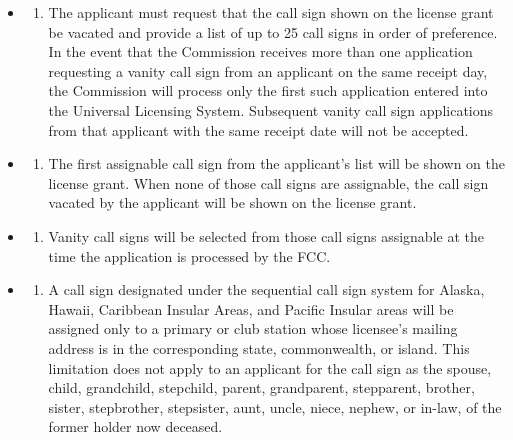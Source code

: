 \documentclass[
  letterpaper,
  DIV=11,
  numbers=noendperiod]{scrreport}
\providecommand{\tightlist}{%
  \setlength{\itemsep}{0pt}\setlength{\parskip}{0pt}}\usepackage{longtable,booktabs,array}
\begin{document}
\begin{itemize}
\item
  \begin{enumerate}
  \def\labelenumi{(\arabic{enumi})}
  \tightlist
  \item
    The applicant must request that the call sign shown on the license
    grant be vacated and provide a list of up to 25 call signs in order
    of preference. In the event that the Commission receives more than
    one application requesting a vanity call sign from an applicant on
    the same receipt day, the Commission will process only the first
    such application entered into the Universal Licensing System.
    Subsequent vanity call sign applications from that applicant with
    the same receipt date will not be accepted.
  \end{enumerate}
\item
  \begin{enumerate}
  \def\labelenumi{(\arabic{enumi})}
  \setcounter{enumi}{1}
  \tightlist
  \item
    The first assignable call sign from the applicant's list will be
    shown on the license grant. When none of those call signs are
    assignable, the call sign vacated by the applicant will be shown on
    the license grant.
  \end{enumerate}
\item
  \begin{enumerate}
  \def\labelenumi{(\arabic{enumi})}
  \setcounter{enumi}{2}
  \tightlist
  \item
    Vanity call signs will be selected from those call signs assignable
    at the time the application is processed by the FCC.
  \end{enumerate}
\item
  \begin{enumerate}
  \def\labelenumi{(\arabic{enumi})}
  \setcounter{enumi}{3}
  \tightlist
  \item
    A call sign designated under the sequential call sign system for
    Alaska, Hawaii, Caribbean Insular Areas, and Pacific Insular areas
    will be assigned only to a primary or club station whose licensee's
    mailing address is in the corresponding state, commonwealth, or
    island. This limitation does not apply to an applicant for the call
    sign as the spouse, child, grandchild, stepchild, parent,
    grandparent, stepparent, brother, sister, stepbrother, stepsister,
    aunt, uncle, niece, nephew, or in-law, of the former holder now
    deceased.
  \end{enumerate}
\end{itemize}
\end{document}
